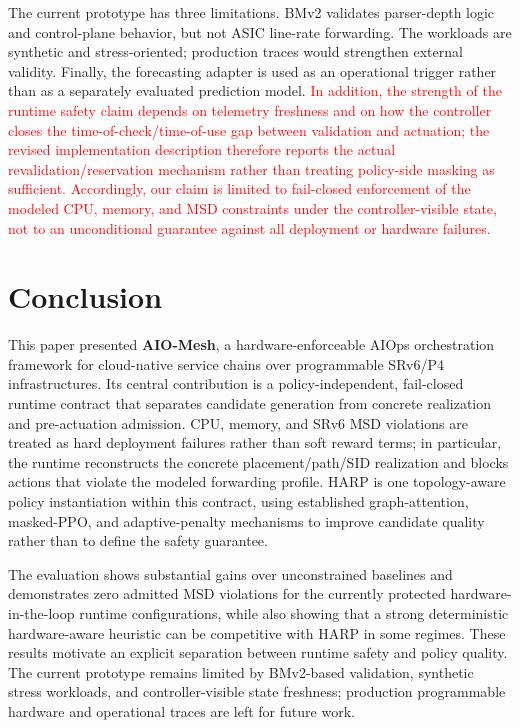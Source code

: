 \documentclass[final,5p]{elsarticle}
\newcommand{\rev}[1]{\textcolor{red}{#1}}
\newenvironment{revision}{\color{red}}{}
\begin{document}
The current prototype has three limitations. BMv2 validates parser-depth logic and control-plane behavior, but not ASIC line-rate forwarding. The workloads are synthetic and stress-oriented; production traces would strengthen external validity. Finally, the forecasting adapter is used as an operational trigger rather than as a separately evaluated prediction model. \rev{In addition, the strength of the runtime safety claim depends on telemetry freshness and on how the controller closes the time-of-check/time-of-use gap between validation and actuation; the revised implementation description therefore reports the actual revalidation/reservation mechanism rather than treating policy-side masking as sufficient.} \rev{Accordingly, our claim is limited to fail-closed enforcement of the modeled CPU, memory, and MSD constraints under the controller-visible state, not to an unconditional guarantee against all deployment or hardware failures.}


\section{Conclusion}
\label{sec:conclusion}
\begin{revision}
This paper presented \textbf{AIO-Mesh}, a hardware-enforceable AIOps orchestration framework for cloud-native service chains over programmable SRv6/P4 infrastructures. Its central contribution is a policy-independent, fail-closed runtime contract that separates candidate generation from concrete realization and pre-actuation admission. CPU, memory, and SRv6 MSD violations are treated as hard deployment failures rather than soft reward terms; in particular, the runtime reconstructs the concrete placement/path/SID realization and blocks actions that violate the modeled forwarding profile. HARP is one topology-aware policy instantiation within this contract, using established graph-attention, masked-PPO, and adaptive-penalty mechanisms to improve candidate quality rather than to define the safety guarantee.

The evaluation shows substantial gains over unconstrained baselines and demonstrates zero admitted MSD violations for the currently protected hardware-in-the-loop runtime configurations, while also showing that a strong deterministic hardware-aware heuristic can be competitive with HARP in some regimes. These results motivate an explicit separation between runtime safety and policy quality. The current prototype remains limited by BMv2-based validation, synthetic stress workloads, and controller-visible state freshness; production programmable hardware and operational traces are left for future work.
\end{revision}
\end{document}
